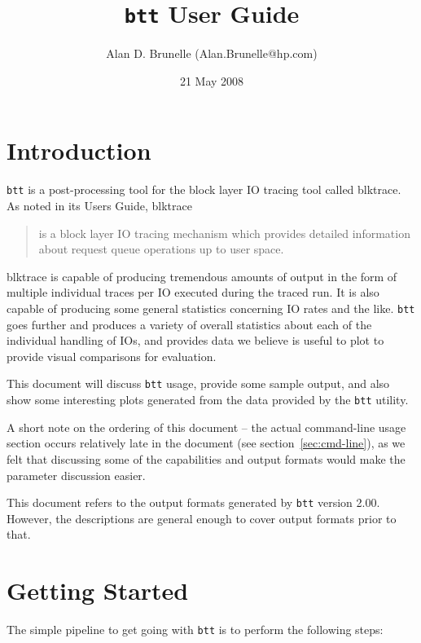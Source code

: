 \documentclass{article}
\title{\texttt{btt} User Guide}
\author{Alan D. Brunelle (Alan.Brunelle@hp.com)}
\date{21 May 2008}
\begin{document}
\maketitle
\section{\label{sec:intro}Introduction}

\texttt{btt} is a post-processing tool for the block layer IO tracing
tool called blktrace. As noted in its Users Guide, blktrace

  \begin{quotation}
    is a block layer IO tracing mechanism which provides detailed
    information about request queue operations up to user space.
  \end{quotation}

blktrace is capable of producing tremendous amounts of output in the
form of multiple individual traces per IO executed during the traced
run. It is also capable of producing some general statistics concerning
IO rates and the like. \texttt{btt} goes further and produces a variety
of overall statistics about each of the individual handling of IOs, and
provides data we believe is useful to plot to provide visual comparisons
for evaluation.

This document will discuss \texttt{btt} usage, provide some sample output,
and also show some interesting plots generated from the data provided
by the \texttt{btt} utility.

\bigskip
A short note on the ordering of this document -- the actual
command-line usage section occurs relatively late in the document (see
section~\ref{sec:cmd-line}), as we felt that discussing some of the
capabilities and output formats would make the parameter discussion
easier.

\bigskip
  This document refers to the output formats generated by \texttt{btt}
  version 2.00.  However, the descriptions are general enough to cover
  output formats prior to that.

\newpage\tableofcontents

\newpage\section{\label{sec:getting-started}Getting Started}

  The simple pipeline to get going with \texttt{btt} is to perform the
  following steps:
\end{document}
